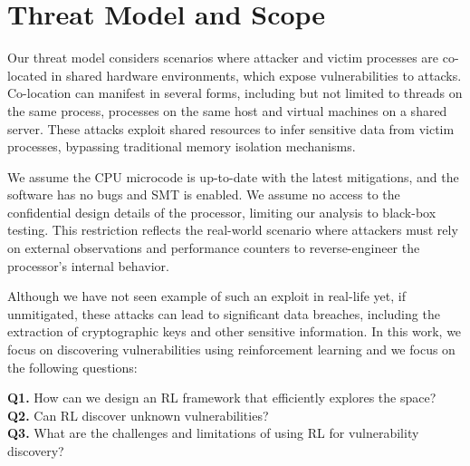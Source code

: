 
\section{Threat Model and Scope}
Our threat model considers scenarios where attacker and victim processes are co-located in shared hardware environments, which expose vulnerabilities to \Mi attacks.
Co-location can manifest in several forms, including but not limited to threads on the same process, processes on the same host and virtual machines on a shared server. These attacks exploit shared \Mi resources to infer sensitive data from victim processes, bypassing traditional memory isolation mechanisms.

We assume the CPU microcode is up-to-date with the latest mitigations, and the software has no bugs and SMT is enabled.
We assume no access to the confidential design details of the processor, limiting our analysis to black-box testing. This restriction reflects the real-world scenario where attackers must rely on external observations and performance counters to reverse-engineer the processor's internal behavior.

Although we have not seen example of such an exploit in real-life yet, if unmitigated, these attacks can lead to significant data breaches, including the extraction of cryptographic keys and other sensitive information.
In this work, we focus on discovering \Mi vulnerabilities using reinforcement learning and we focus on the following questions: 
\medskip

\noindent
\textbf{Q1.} How can we design an RL framework that efficiently explores the \Mi space? \\

\noindent \textbf{Q2.} Can RL discover unknown \Mi vulnerabilities? \\

\noindent \textbf{Q3.} What are the challenges and limitations of using RL for \Mi vulnerability discovery?


